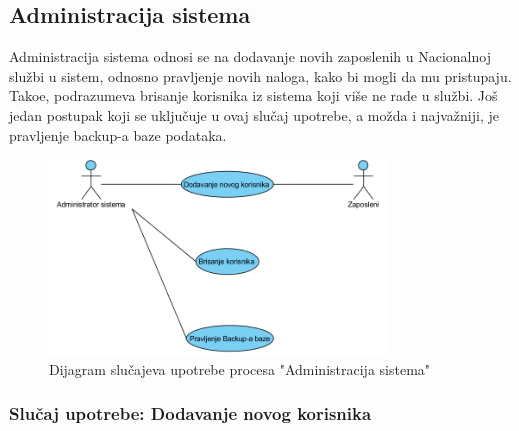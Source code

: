 \subsection{Administracija sistema}

Administracija sistema odnosi se na dodavanje novih zaposlenih u Nacionalnoj slu\v zbi u sistem, odnosno pravljenje novih naloga, kako bi mogli da mu pristupaju. Tako\dj e, podrazumeva brisanje korisnika iz sistema koji vi\v se ne rade u slu\v zbi. Jo\v s jedan postupak koji se uklju\v cuje u ovaj slu\v caj upotrebe, a mo\v zda i najva\v zniji, je pravljenje backup-a baze podataka.

\begin{figure}[H]
	\centering
	\includegraphics[width=0.8\textwidth]{dijagrami/dijagrami-slucajeva-upotrebe/administracija-sistema.png}
	\caption{Dijagram slu\v cajeva upotrebe procesa "Administracija sistema"}
	\label{dsu: administracija sistema}
\end{figure}

\subsubsection{Slu\v caj upotrebe: Dodavanje novog korisnika}

